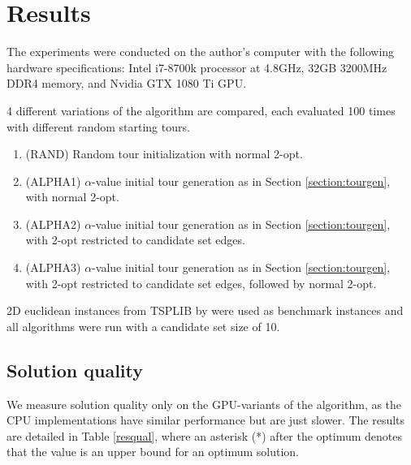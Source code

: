 \documentclass[english, 12pt, a4paper, sci, utf8, a-1b, online]{aaltothesis}
\begin{document}
\section{Results} \label{section:res}
The experiments were conducted on the author's computer with the following hardware specifications: Intel i7-8700k processor at 4.8GHz, 32GB 3200MHz DDR4 memory, and Nvidia GTX 1080 Ti GPU.

4 different variations of the algorithm are compared, each evaluated 100 times with different random starting tours.
\begin{enumerate}
	\item (RAND) Random tour initialization with normal 2-opt.
	\item (ALPHA1) $\alpha$-value initial tour generation as in Section \ref{section:tourgen}, with normal 2-opt.
	\item (ALPHA2) $\alpha$-value initial tour generation as in Section \ref{section:tourgen}, with 2-opt restricted to candidate set edges.
	\item (ALPHA3) $\alpha$-value initial tour generation as in Section \ref{section:tourgen}, with 2-opt restricted to candidate set edges, followed by normal 2-opt.
\end{enumerate}

2D euclidean instances from TSPLIB by \cite{Rein91} were used as benchmark instances and all algorithms were run with a candidate set size of 10.

\subsection{Solution quality}
We measure solution quality only on the GPU-variants of the algorithm, as the CPU implementations have similar performance but are just slower. The results are detailed in Table \ref{resqual}, where an asterisk (*) after the optimum denotes that the value is an upper bound for an optimum solution. 
\end{document}
